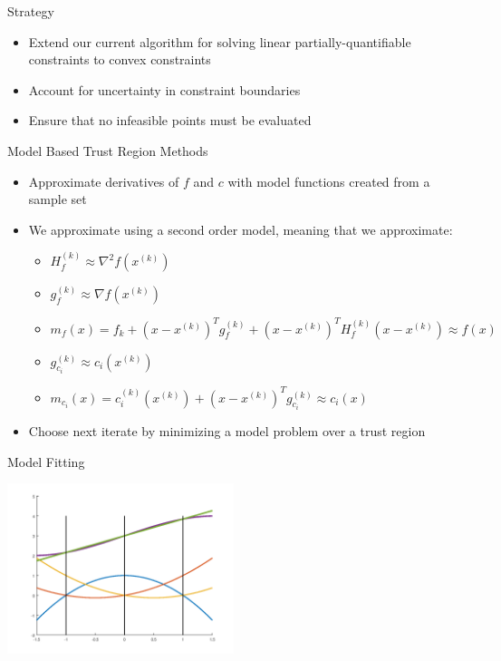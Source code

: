 \documentclass{beamer}
\newcommand{\xk}{{{x}^{(k)}}}
\newcommand{\mk}{{m_f}}
\newcommand{\fk}{{f_k}}
\newcommand{\fgk}{{g^{(k)}_f}}
\newcommand{\fhk}{{H^{(k)}_f}}
\newcommand{\ck}{{c^{(k)}_{i}(\xk)}}
\newcommand{\cgk}{{g^{(k)}_{c_i}}}
\newcommand{\mck}{{m_{c_i}}}
\begin{document}
\begin{frame}{Strategy}
    \begin{itemize}
        \item Extend our current algorithm for solving linear partially-quantifiable constraints to convex constraints
        \item Account for uncertainty in constraint boundaries
        \item Ensure that no infeasible points must be evaluated
    \end{itemize}
\end{frame}





\begin{frame}{Model Based Trust Region Methods}
    \begin{itemize}
        \setlength\itemsep{2em}
    	\item Approximate derivatives of $f$ and $c$ with model functions created from a sample set
    	\item We approximate using a second order model, meaning that we approximate:
    	\begin{itemize}
            \item $\fhk \approx \nabla ^2 f(\xk)$
            \item $\fgk \approx \nabla f(\xk)$
            \item $\mk(x) = \fk + \left(x - \xk \right)^T\fgk + \left(x - \xk \right)^T\fhk\left(x - \xk \right) \approx f(x)$
            \item $\cgk \approx c_i(\xk)$
            \item $\mck(x) = \ck + \left(x - \xk\right)^T\cgk \approx c_i(x)$
    	\end{itemize}
	    \item Choose next iterate by minimizing a model problem over a trust region
	\end{itemize}
\end{frame}


\begin{frame}{Model Fitting}
	\begin{center}
		\includegraphics[width=250px]{images/lagrange_polynomials.png}
	\end{center}
\end{frame}
\end{document}
